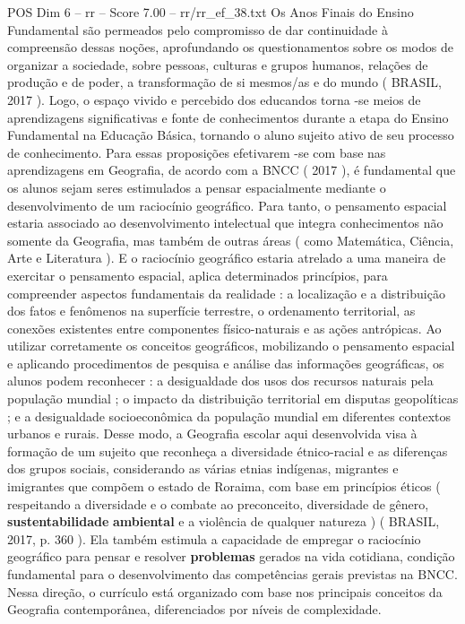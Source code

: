 \begin{textsample}{POS Dim 6 – rr – Score 7.00 – rr/rr\_ef\_38.txt}
Os Anos Finais do Ensino Fundamental são permeados pelo compromisso de dar continuidade à compreensão dessas noções, aprofundando os questionamentos sobre os modos de organizar a sociedade, sobre pessoas, culturas e grupos humanos, relações de produção e de poder, a transformação de si mesmos/as e do mundo ( BRASIL, 2017 ).
Logo, o espaço vivido e percebido dos educandos torna -se meios de aprendizagens significativas e fonte de conhecimentos durante a etapa do Ensino Fundamental na Educação Básica, tornando o aluno sujeito ativo de seu processo de conhecimento.
Para essas proposições efetivarem -se com base nas aprendizagens em Geografia, de acordo com a BNCC ( 2017 ), é fundamental que os alunos sejam seres estimulados a pensar espacialmente mediante o desenvolvimento de um raciocínio geográfico.
Para tanto, o pensamento espacial estaria associado ao desenvolvimento intelectual que integra conhecimentos não somente da Geografia, mas também de outras áreas ( como Matemática, Ciência, Arte e Literatura ).
E o raciocínio geográfico estaria atrelado a uma maneira de exercitar o pensamento espacial, aplica determinados princípios, para compreender aspectos fundamentais da realidade : a localização e a distribuição dos fatos e fenômenos na superfície terrestre, o ordenamento territorial, as conexões existentes entre componentes físico-naturais e as ações antrópicas.
Ao utilizar corretamente os conceitos geográficos, mobilizando o pensamento espacial e aplicando procedimentos de pesquisa e análise das informações geográficas, os alunos podem reconhecer : a desigualdade dos usos dos recursos naturais pela população mundial ; o impacto da distribuição territorial em disputas geopolíticas ; e a desigualdade socioeconômica da população mundial em diferentes contextos urbanos e rurais.
Desse modo, a Geografia escolar aqui desenvolvida visa à formação de um sujeito que reconheça a diversidade étnico-racial e as diferenças dos grupos sociais, considerando as várias etnias indígenas, migrantes e imigrantes que compõem o estado de Roraima, com base em princípios éticos ( respeitando a diversidade e o combate ao preconceito, diversidade de gênero, \textbf{sustentabilidade} \textbf{ambiental} e a violência de qualquer natureza ) ( BRASIL, 2017, p. 360 ).
Ela também estimula a capacidade de empregar o raciocínio geográfico para pensar e resolver \textbf{problemas} gerados na vida cotidiana, condição fundamental para o desenvolvimento das competências gerais previstas na BNCC.
Nessa direção, o currículo está organizado com base nos principais conceitos da Geografia contemporânea, diferenciados por níveis de complexidade.

\end{textsample}
